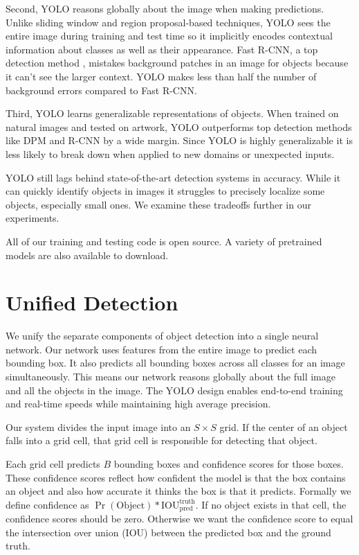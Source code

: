 \documentclass[10pt,twocolumn,letterpaper]{article}
\begin{document}
Second, YOLO reasons globally about the image when making predictions. Unlike sliding window and region proposal-based techniques, YOLO sees the entire image during training and test time so it implicitly encodes contextual information about classes as well as their appearance. Fast R-CNN, a top detection method \cite{DBLP:journals/corr/Girshick15}, mistakes background patches in an image for objects because it can't see the larger context. YOLO makes less than half the number of background errors compared to Fast R-CNN.

Third, YOLO learns generalizable representations of objects. When trained on natural images and tested on artwork, YOLO outperforms top detection methods like DPM and R-CNN by a wide margin. Since YOLO is highly generalizable it is less likely to break down when applied to new domains or unexpected inputs.

YOLO still lags behind state-of-the-art detection systems in accuracy. While it can quickly identify objects in images it struggles to precisely localize some objects, especially small ones. We examine these tradeoffs further in our experiments.

All of our training and testing code is open source.
A variety of pretrained models are also available to download.

\section{Unified Detection}

We unify the separate components of object detection into a single neural network. Our network uses features from the entire image to predict each bounding box. It also predicts all bounding boxes across all classes for an image simultaneously. This means our network reasons globally about the full image and all the objects in the image. The YOLO design enables end-to-end training and real-time speeds while maintaining high average precision.

Our system divides the input image into an $S \times S$ grid. If the center of an object falls into a grid cell, that grid cell is responsible for detecting that object.

Each grid cell predicts $B$ bounding boxes and confidence scores for those boxes. These confidence scores reflect how confident the model is that the box contains an object and also how accurate it thinks the box is that it predicts. Formally we define confidence as $\Pr(\textrm{Object}) * \textrm{IOU}_{\textrm{pred}}^{\textrm{truth}}$. If no object exists in that cell, the confidence scores should be zero. Otherwise we want the confidence score to equal the intersection over union (IOU) between the predicted box and the ground truth.
\end{document}
